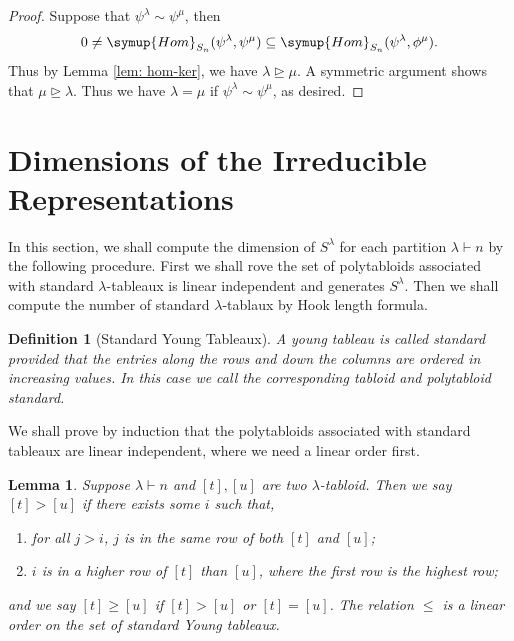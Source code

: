 \documentclass{assignment}[2019/10/15]
\theoremstyle{plain}
\newtheorem{definition}[theorem]{Definition}
\newtheorem{lemma}[theorem]{Lemma}
\newcommand{\Hom}{\mathop{}\!\symup{Hom}}
\begin{document}
    \begin{proof}
        Suppose that $\psi^\lambda\sim\psi^\mu$, then
        \begin{equation}
            0\neq \Hom_{S_n}(\psi^\lambda, \psi^\mu)\subseteq \Hom_{S_n}(\psi^\lambda, \phi^\mu).
        \end{equation}
        Thus by Lemma \ref{lem: hom-ker}, we have $\lambda\unrhd\mu$. A symmetric argument shows that $\mu\unrhd\lambda$. Thus we have $\lambda=\mu$ if $\psi^\lambda\sim\psi^\mu$, as desired.
    \end{proof}

    \section{Dimensions of the Irreducible Representations}

    In this section, we shall compute the dimension of $S^\lambda$ for each partition $\lambda\vdash n$ by the following procedure. First we shall rove the set of polytabloids associated with standard $\lambda$-tableaux is linear independent and generates $S^\lambda$. Then we shall compute the number of standard $\lambda$-tablaux by Hook length formula.

    \begin{definition}[Standard Young Tableaux]
        A young tableau is called \emph{standard} provided that the entries along the rows and down the columns are ordered in increasing values. In this case we call the corresponding tabloid and polytabloid standard.
    \end{definition}

    We shall prove by induction that the polytabloids associated with standard tableaux are linear independent, where we need a linear order first.

    \begin{lemma}
        Suppose $\lambda\vdash n$ and $[t], [u]$ are two $\lambda$-tabloid. Then we say $[t]>[u]$ if there exists some $i$ such that,
        \begin{enumerate}[(1)]
            \item for all $j>i$, $j$ is in the same row of both $[t]$ and $[u]$;
            \item $i$ is in a higher row of $[t]$ than $[u]$, where the first row is the highest row;
        \end{enumerate}
        and we say $[t]\geq [u]$ if $[t]>[u]$ or $[t]=[u]$. The relation $\leq$ is a linear order on the set of standard Young tableaux.
    \end{lemma}
\end{document}
